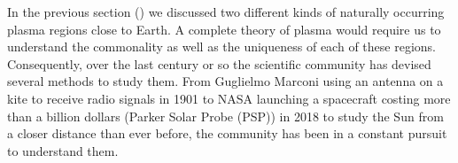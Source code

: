         In the previous section () we discussed two different kinds of naturally
        occurring plasma regions close to Earth. A complete theory of plasma would require us to
        understand the commonality as well as the uniqueness of each of these regions. Consequently,
        over the last century or so the scientific community has devised several methods to study
        them. From Guglielmo Marconi using an antenna on a kite to receive radio signals in 1901 to
        NASA launching a spacecraft costing more than a billion dollars (Parker Solar Probe (PSP))
        in 2018 to study the Sun from a closer distance than ever before, the community has been in
        a constant pursuit to understand them. 

